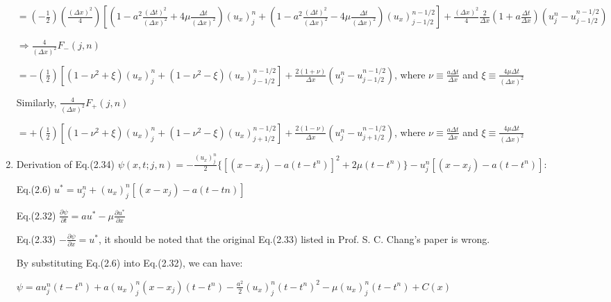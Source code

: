 \documentclass[a4paper,12pt]{article}
\begin{document}
\begin{enumerate}
        \hspace{6mm}$=(-\frac{1}{2})(\frac{(\Delta x)^{2}}{4})[(1-a^{2}\frac{(\Delta t)^{2}}{(\Delta x)^{2}}+4\mu\frac{\Delta t}{(\Delta x)^{2}})(u_{x})^{n}_{j}+(1-a^{2}\frac{(\Delta t)^{2}}{(\Delta x)^{2}}-4\mu\frac{\Delta t}{(\Delta x)^{2}})(u_{x})^{n-1/2}_{j-1/2}]+\frac{(\Delta x)^{2}}{4}\frac{2}{\Delta x}(1+a\frac{\Delta t}{\Delta x})(u^{n}_{j}-u^{n-1/2}_{j-1/2})$

        \hspace{4mm}$\Rightarrow\frac{4}{(\Delta x)^{2}}F_{-}(j,n)$

        \hspace{6mm}$=-(\frac{1}{2})[(1-\nu^{2}+\xi)(u_{x})^{n}_{j}+(1-\nu^{2}-\xi)(u_{x})^{n-1/2}_{j-1/2}]+\frac{2(1+\nu)}{\Delta x}(u^{n}_{j}-u^{n-1/2}_{j-1/2})$, where $\nu\equiv\frac{a\Delta t}{\Delta x}$ and $\xi\equiv\frac{4\mu\Delta t}{(\Delta x)^{2}}$

        \hspace{4mm}Similarly, $\frac{4}{(\Delta x)^{2}}F_{+}(j,n)$

        \hspace{6mm}$=+(\frac{1}{2})[(1-\nu^{2}+\xi)(u_{x})^{n}_{j}+(1-\nu^{2}-\xi)(u_{x})^{n-1/2}_{j+1/2}]+\frac{2(1-\nu)}{\Delta x}(u^{n}_{j}-u^{n-1/2}_{j+1/2})$, where $\nu\equiv\frac{a\Delta t}{\Delta x}$ and $\xi\equiv\frac{4\mu\Delta t}{(\Delta x)^{2}}$

  \item Derivation of Eq.(2.34) $\psi(x,t;j,n)=-\frac{(u_{x})^{n}_{j}}{2}\{[(x-x_{j})-a(t-t^{n})]^{2}+2\mu(t-t^{n})\}-u^{n}_{j}[(x-x_{j})-a(t-t^{n})]$:

        \hspace{4mm}Eq.(2.6) $u^{*}=u^{n}_{j}+(u_{x})^{n}_{j}[(x-x_{j})-a(t-t{n})]$

        \hspace{4mm}Eq.(2.32) $\frac{\partial\psi}{\partial t}=au^{*}-\mu\frac{\partial u^{*}}{\partial x}$

        \hspace{4mm}Eq.(2.33) $-\frac{\partial\psi}{\partial x}=u^{*}$, it should be noted that the original Eq.(2.33) listed in Prof. S. C. Chang's paper is wrong.

        \hspace{4mm}By substituting Eq.(2.6) into Eq.(2.32), we can have:

        \hspace{8mm}$\psi=au^{n}_{j}(t-t^{n})+a(u_{x})^{n}_{j}(x-x_{j})(t-t^{n})-\frac{a^{2}}{2}(u_{x})^{n}_{j}(t-t^{n})^{2}-\mu(u_{x})^{n}_{j}(t-t^{n})+C(x)$


\end{enumerate}
\end{document}
